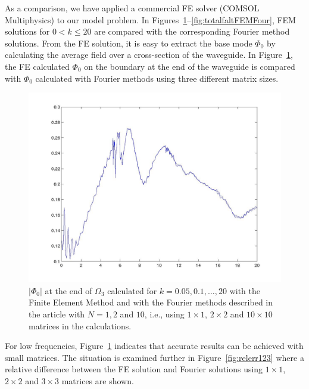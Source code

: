 \documentclass[numreferences]{kluwer}
\providecommand{\abs}[1]{\left\lvert#1\right\rvert}
\renewcommand{\Phi}{\varPhi}
\renewcommand{\Phi}{\varPhi}
\begin{document}
As a comparison, we have applied a commercial FE solver (COMSOL
Multiphysics) to our model problem. In
Figures~\ref{fig:FEMvsFourier}--\ref{fig:totalfaltFEMFour}, FEM
solutions for $0<k\le20$ are compared with the corresponding Fourier
method solutions. From the FE solution, it is easy to extract the base
mode $\Phi_0$ by calculating the average field over a cross-section
of the waveguide. In Figure~\ref{fig:FEMvsFourier}, the FE calculated
$\Phi_0$ on the boundary at the end of the waveguide is compared with $\Phi_0$
calculated with Fourier methods using three different matrix sizes. 
\begin{figure}[htb]
  \centering
  \includegraphics[width=\linewidth]{FEMvsFourier}
  \caption{$\abs{\Phi_{0}}$ at the end of $\Omega_3$ calculated for
    $k=0.05,0.1,\dots,20$ with the Finite Element Method and with the
    Fourier methods described in the article with $N=1,2$ and $10$,
    i.e., using $1\times1$, $2\times2$ and $10\times10$ matrices in
    the calculations.}
  \label{fig:FEMvsFourier}
\end{figure}

For low frequencies, Figure~\ref{fig:FEMvsFourier} indicates that
accurate results can be achieved with small matrices. The situation is
examined further in Figure~\ref{fig:relerr123} where a relative
difference between the FE solution and Fourier solutions using
$1\times1$, $2\times2$ and $3\times3$ matrices are shown.
\end{document}
